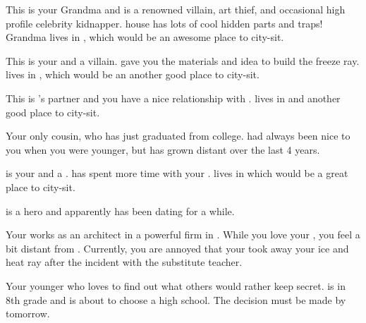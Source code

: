 \documentclass[char]{LRSguildcamp1}
\begin{document}
\begin{contacts}
	\contact{\cGrandma{}} This is your Grandma and is a renowned villain, art thief, and occasional high profile celebrity kidnapper. \cGrandma{\their} house has lots of cool hidden parts and traps! Grandma lives in \pCityGrandma{}, which would be an awesome place to city-sit. 
	
	\contact{\cOldest{}} This is your  \cOldest{\uncle} and \cOldest{\theyare} a villain. \cOldest{\They} gave you the materials and idea to build the freeze ray. \cOldest{} lives in \pCityO{}, which would be an another good place to city-sit.
	
	\contact{\cOS{}} This is \cOldest{}'s partner and you have a nice relationship with \cOS{\them}. \cOS{} lives in \pCityO{} and another good place to city-sit.
	
	\contact{\cGrad{}} Your only cousin, who has just graduated from college. \cGrad{} had always been nice to you when you were younger, but has grown distant over the last 4 years.  
	
	\contact{\cYoungest{}} \cYoungest{} is your \cYoungest{\uncle} and a \cYoungest{\hero}. \cTween{} has spent more time with your \cYoungest{\uncle}. \cYoungest{} lives in \pCityYoungest{} which would be a great place to city-sit.
 
	\contact{\cYS{}} \cYS{} is a hero and apparently has been dating \cYoungest{} for a while. 
	
	\contact{\cArchitect{}} Your \cArchitect{\parent} works as an architect in a powerful firm in \pCityArchitect{}.  While you love your \cArchitect{\parent}, you feel a bit distant from \cArchitect{\them}. Currently, you are annoyed that your 
\cArchitect{\parent} took away your ice and heat ray after the incident with the substitute teacher. 
	
	 	\contact{\cTween{}} Your younger \cTween{\sibling} who loves to find out what others would rather keep secret. \cTween{} is in 8th grade and is about to choose a high school. The decision must be made by tomorrow. 
		
\end{contacts}
\end{document}
